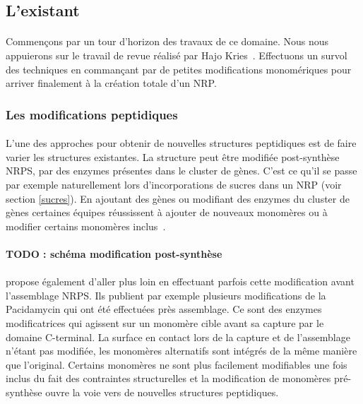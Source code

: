 \documentclass[12pt,french,twoside]{report}
\begin{document}
\subsection{L'existant}

\paragraph{}Commençons par un tour d'horizon des travaux de ce domaine.
Nous nous appuierons sur le travail de revue réalisé par Hajo Kries~\cite{kries_biosynthetic_2016}.
Effectuons un survol des techniques en commançant par de petites modifications monomériques pour arriver finalement à la création totale d'un NRP.


\subsubsection{Les modifications peptidiques}

\paragraph{}L'une des approches pour obtenir de nouvelles structures peptidiques est de faire varier les structures existantes.
La structure peut être modifiée post-synthèse NRPS, par des enzymes présentes dans le cluster de gènes.
C'est ce qu'il se passe par exemple naturellement lors d'incorporations de sucres dans un NRP (voir section \ref{sucres}).
En ajoutant des gènes ou modifiant des enzymes du cluster de gènes certaines équipes réussissent à ajouter de nouveaux monomères ou à modifier certains monomères inclus~\cite{giessen_ribosome-independent_2012}.

\paragraph{TODO : schéma modification post-synthèse}

\paragraph{}\cite{winn_recent_2016} propose également d'aller plus loin en effectuant parfois cette modification avant l'assemblage NRPS.
Ils publient par exemple plusieurs modifications de la Pacidamycin qui ont été effectuées près assemblage.
Ce sont des enzymes modificatrices qui agissent sur un monomère cible avant sa capture par le domaine C-terminal.
La surface en contact lors de la capture et de l'assemblage n'étant pas modifiée, les monomères alternatifs sont intégrés de la même manière que l'original.
Certains monomères ne sont plus facilement modifiables une fois inclus du fait des contraintes structurelles et la modification de monomères pré-synthèse ouvre la voie vers de nouvelles structures peptidiques.
\end{document}
